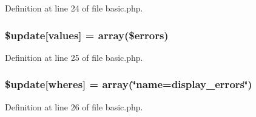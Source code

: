 Definition at line 24 of file basic.\+php.

\subsubsection[{\texorpdfstring{\$update}{$update}}]{\setlength{\rightskip}{0pt plus 5cm}\${\bf update}\mbox{[}\textquotesingle{}values\textquotesingle{}\mbox{]} = array(\$errors)}\hypertarget{basic_8php_ac82a75b4c6df37380ff77c88f041785e}{}\label{basic_8php_ac82a75b4c6df37380ff77c88f041785e}


Definition at line 25 of file basic.\+php.

\subsubsection[{\texorpdfstring{\$update}{$update}}]{\setlength{\rightskip}{0pt plus 5cm}\${\bf update}\mbox{[}\textquotesingle{}wheres\textquotesingle{}\mbox{]} = array(\char`\"{}name=\textquotesingle{}display\+\_\+errors\textquotesingle{}\char`\"{})}\hypertarget{basic_8php_aacde4479a904b32d0f24dea4e01f148c}{}\label{basic_8php_aacde4479a904b32d0f24dea4e01f148c}


Definition at line 26 of file basic.\+php.

